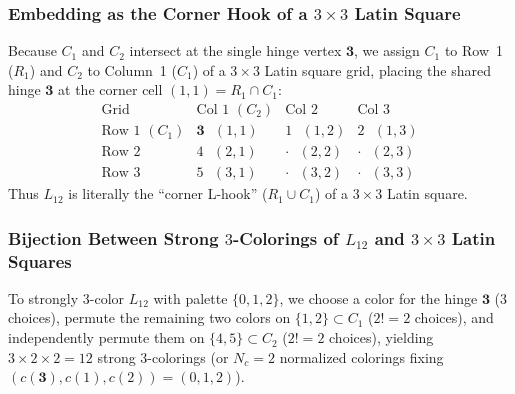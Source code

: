 \documentclass[aps,pra,reprint,superscriptaddress,longbibliography,nofootinbib,floatfix,10pt]{revtex4-2}
\theoremstyle{definition}\newtheorem{definition}[theorem]{Definition}
\theoremstyle{remark}\newtheorem{remark}[theorem]{Remark}
\begin{document}
\subsubsection{Embedding as the Corner Hook of a \texorpdfstring{$3\times 3$}{3x3} Latin Square}
Because $C_1$ and $C_2$ intersect at the single hinge vertex $\mathbf{3}$, we assign $C_1$ to Row~1 ($R_1$) and $C_2$ to Column~1 ($C_1$) of a $3\times 3$ Latin square grid, placing the shared hinge $\mathbf{3}$ at the corner cell $(1,1)=R_1\cap C_1$:
\begin{equation}\label{eq:L12-grid}
\begin{array}{c|ccc}
\text{Grid} & \text{Col 1 }(C_2) & \text{Col 2} & \text{Col 3}\\\hline
\text{Row 1 }(C_1) & \mathbf{3}\text{ }(1,1) & 1\text{ }(1,2) & 2\text{ }(1,3)\\
\text{Row 2} & 4\text{ }(2,1) & \cdot\text{ }(2,2) & \cdot\text{ }(2,3)\\
\text{Row 3} & 5\text{ }(3,1) & \cdot\text{ }(3,2) & \cdot\text{ }(3,3)
\end{array}
\end{equation}
Thus $L_{12}$ is literally the ``corner L-hook'' ($R_1\cup C_1$) of a $3\times 3$ Latin square.

\subsubsection{Bijection Between Strong \texorpdfstring{$3$}{3}-Colorings of \texorpdfstring{$L_{12}$}{L12} and \texorpdfstring{$3\times 3$}{3x3} Latin Squares}
To strongly $3$-color $L_{12}$ with palette $\{0,1,2\}$, we choose a color for the hinge $\mathbf{3}$ ($3$ choices), permute the remaining two colors on $\{1,2\}\subset C_1$ ($2!=2$ choices), and independently permute them on $\{4,5\}\subset C_2$ ($2!=2$ choices), yielding $3\times 2\times 2=12$ strong $3$-colorings (or $N_c=2$ normalized colorings fixing $(c(\mathbf{3}),c(1),c(2))=(0,1,2)$).
\end{document}
